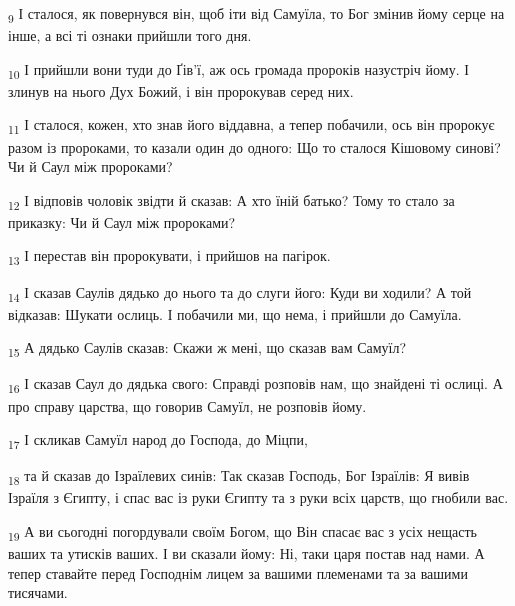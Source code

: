 \begin{tcolorbox}
\textsubscript{9} І сталося, як повернувся він, щоб іти від Самуїла, то Бог змінив йому серце на інше, а всі ті ознаки прийшли того дня.
\end{tcolorbox}
\begin{tcolorbox}
\textsubscript{10} І прийшли вони туди до Ґів'ї, аж ось громада пророків назустріч йому. І злинув на нього Дух Божий, і він пророкував серед них.
\end{tcolorbox}
\begin{tcolorbox}
\textsubscript{11} І сталося, кожен, хто знав його віддавна, а тепер побачили, ось він пророкує разом із пророками, то казали один до одного: Що то сталося Кішовому синові? Чи й Саул між пророками?
\end{tcolorbox}
\begin{tcolorbox}
\textsubscript{12} І відповів чоловік звідти й сказав: А хто їній батько? Тому то стало за приказку: Чи й Саул між пророками?
\end{tcolorbox}
\begin{tcolorbox}
\textsubscript{13} І перестав він пророкувати, і прийшов на пагірок.
\end{tcolorbox}
\begin{tcolorbox}
\textsubscript{14} І сказав Саулів дядько до нього та до слуги його: Куди ви ходили? А той відказав: Шукати ослиць. І побачили ми, що нема, і прийшли до Самуїла.
\end{tcolorbox}
\begin{tcolorbox}
\textsubscript{15} А дядько Саулів сказав: Скажи ж мені, що сказав вам Самуїл?
\end{tcolorbox}
\begin{tcolorbox}
\textsubscript{16} І сказав Саул до дядька свого: Справді розповів нам, що знайдені ті ослиці. А про справу царства, що говорив Самуїл, не розповів йому.
\end{tcolorbox}
\begin{tcolorbox}
\textsubscript{17} І скликав Самуїл народ до Господа, до Міцпи,
\end{tcolorbox}
\begin{tcolorbox}
\textsubscript{18} та й сказав до Ізраїлевих синів: Так сказав Господь, Бог Ізраїлів: Я вивів Ізраїля з Єгипту, і спас вас із руки Єгипту та з руки всіх царств, що гнобили вас.
\end{tcolorbox}
\begin{tcolorbox}
\textsubscript{19} А ви сьогодні погордували своїм Богом, що Він спасає вас з усіх нещасть ваших та утисків ваших. І ви сказали йому: Ні, таки царя постав над нами. А тепер ставайте перед Господнім лицем за вашими племенами та за вашими тисячами.
\end{tcolorbox}
